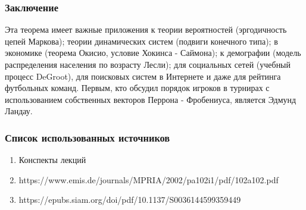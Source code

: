 \documentclass[a4paper,12pt,leqno]{article} %
\begin{document}
\newpage
\subsubsection*{Заключение}
Эта теорема имеет важные приложения к теории вероятностей (эргодичность цепей Маркова); 
теории динамических систем (подвиги конечного типа); 
в экономике (теорема Окисио, условие Хокинса - Саймона); 
к демографии (модель распределения населения по возрасту Лесли);
для социальных сетей (учебный процесс DeGroot), для поисковых систем в Интернете  
и даже для рейтинга футбольных команд.  Первым, кто обсудил порядок игроков в турнирах с использованием 
собственных векторов Перрона - Фробениуса, является Эдмунд Ландау.
\subsubsection*{Список использованных источников}
\begin{enumerate}
    \item Конспекты лекций
    \item https://www.emis.de/journals/MPRIA/2002/pa102i1/pdf/102a102.pdf
    \item https://epubs.siam.org/doi/pdf/10.1137/S0036144599359449 
\end{enumerate}
\end{document}
